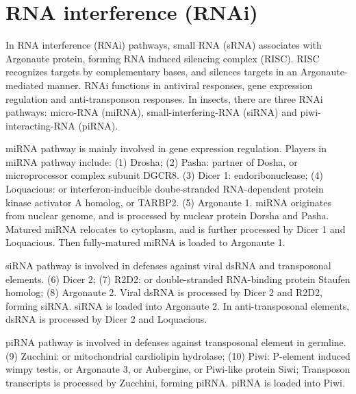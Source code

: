 \documentclass[11pt]{article}
\begin{document}
\begin{sloppypar}
\section*{RNA interference (RNAi)}
In RNA interference (RNAi) pathways, small RNA (sRNA) associates with Argonaute protein, forming RNA induced silencing complex (RISC). 
RISC recognizes targets by complementary bases, and silences targets in an Argonaute-mediated manner. 
RNAi functions in antiviral responses, gene expression regulation and anti-transponson responses. 
In insects, there are three RNAi pathways: micro-RNA (miRNA), small-interfering-RNA (siRNA) and piwi-interacting-RNA (piRNA). 

\par

miRNA pathway is mainly involved in gene expression regulation. 
Players in miRNA pathway include: 
\newline
(1) Drosha; \newline
(2) Pasha: partner of Dosha, or microprocessor complex subunit DGCR8. \newline
(3) Dicer 1: endoribonuclease; \newline
(4) Loquacious: or interferon-inducible doube-stranded RNA-dependent protein kinase activator A homolog, or TARBP2. \newline
(5) Argonaute 1. \newline
miRNA originates from nuclear genome, and is processed by nuclear protein Dorsha and Pasha. 
Matured miRNA relocates to cytoplasm, and is further processed by Dicer 1 and Loquacious. 
Then fully-matured miRNA is loaded to Argonaute 1.

\par 

siRNA pathway is involved in defenses against viral dsRNA and transposonal elements. 
\newline
(6) Dicer 2; \newline
(7) R2D2: or double-stranded RNA-binding protein Staufen homolog; \newline
(8) Argonaute 2. \newline
Viral dsRNA is processed by Dicer 2 and R2D2, forming siRNA. 
siRNA is loaded into Argonaute 2. 
In anti-transposonal elements, dsRNA is processed by Dicer 2 and Loquacious. 

\par

piRNA pathway is involved in defenses against transposonal element in germline. 
\newline
(9) Zucchini: or mitochondrial cardiolipin hydrolase; \newline
(10) Piwi: P-element induced wimpy testis, or Argonaute 3, or Aubergine, or Piwi-like protein Siwi; \newline
Transposon transcripts is processed by Zucchini, forming piRNA. 
piRNA is loaded into Piwi. 


\end{sloppypar}
\end{document}
